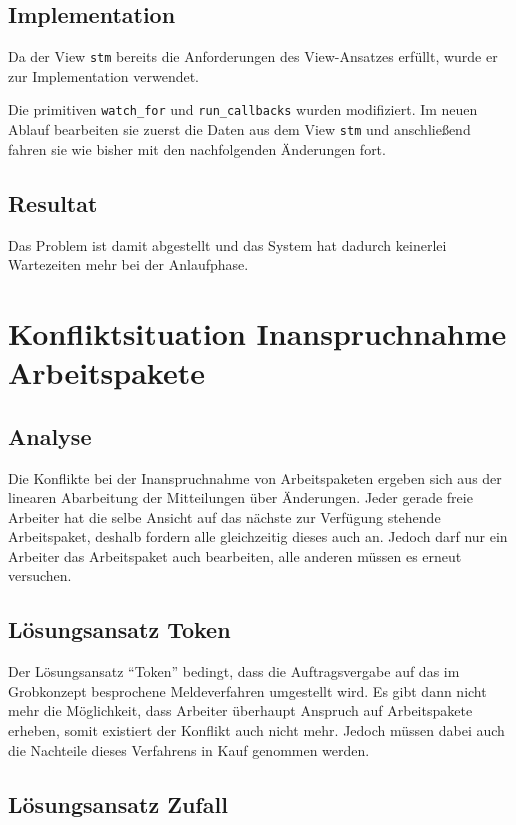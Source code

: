 \subsection{Implementation}
Da der View \verb|stm| bereits die Anforderungen des View-Ansatzes erfüllt,
wurde er zur Implementation verwendet.

Die primitiven \verb|watch_for| und \verb|run_callbacks| wurden modifiziert.
Im neuen Ablauf bearbeiten sie zuerst die Daten aus dem View \verb|stm| und
anschließend fahren sie wie bisher mit den nachfolgenden Änderungen fort.

\subsection{Resultat}
Das Problem ist damit abgestellt und das System hat dadurch keinerlei Wartezeiten mehr bei der Anlaufphase.


\section{Konfliktsituation Inanspruchnahme Arbeitspakete}
\label{cha:opt:conflict-claim}
\subsection{Analyse}
Die Konflikte bei der Inanspruchnahme von Arbeitspaketen ergeben sich aus der linearen Abarbeitung der Mitteilungen über Änderungen.
Jeder gerade freie Arbeiter hat die selbe Ansicht auf das nächste zur Verfügung stehende Arbeitspaket, deshalb fordern alle gleichzeitig dieses auch an.
Jedoch darf nur ein Arbeiter das Arbeitspaket auch bearbeiten,
alle anderen müssen es erneut versuchen.

\subsection{Lösungsansatz Token}
Der Lösungsansatz ``Token'' bedingt, dass die Auftragsvergabe auf das im Grobkonzept besprochene Meldeverfahren umgestellt wird.
Es gibt dann nicht mehr die Möglichkeit, dass Arbeiter überhaupt Anspruch auf Arbeitspakete erheben, somit existiert der Konflikt auch nicht mehr.
Jedoch müssen dabei auch die Nachteile dieses Verfahrens in Kauf genommen werden.

\subsection{Lösungsansatz Zufall}

